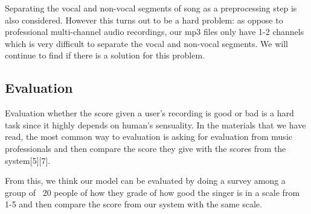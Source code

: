 \documentclass[paper=a4, fontsize=11pt]{scrartcl}
\begin{document}
Separating the vocal and non-vocal segments of song as a preprocessing step is also considered. However this turns out to be a hard problem: as oppose to professional multi-channel audio recordings, our mp3 files only have 1-2 channels which is very difficult to separate the vocal and non-vocal segments. We will continue to find if there is a solution for this problem.

\subsection{Evaluation}

Evaluation whether the score given a user's recording is good or bad is a hard task since it highly depends on human's sensuality. In the materials that we have read, the most common way to evaluation is asking for evaluation from music professionals and then compare the score they give with the scores from the system[5][7]. 

From this, we think our model can be evaluated by doing a survey among a group of ~20 people of how they grade of how good the singer is in a scale from 1-5 and then compare the score from our system with the same scale.
\end{document}
